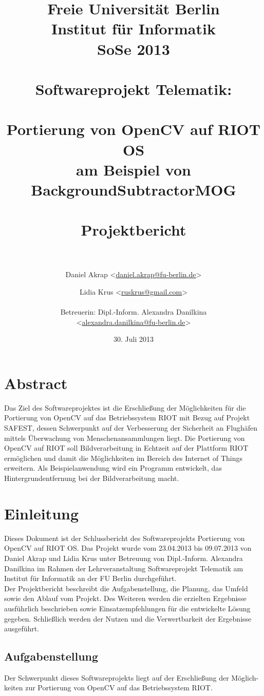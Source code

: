 \documentclass[10pt,a4paper]{article}
\title{Freie Universität Berlin \\
	Institut für Informatik \\
	SoSe 2013 \\ \ \\
	Softwareprojekt Telematik: \\ \ \\
	\textbf {Portierung von OpenCV auf RIOT OS} \\
	\textbf {am Beispiel von BackgroundSubtractorMOG} \\ \ \\
	Projektbericht \\ \ \\}
\author{Daniel Akrap  \textless\href{mailto:daniel.akrap@fu-berlin.de}{daniel.akrap@fu-berlin.de}\textgreater
        \and Lidia Krus \textless\href{mailto:ruskrus@gmail.com}{ruskrus@gmail.com}\textgreater 		\\ \\
	Betreuerin: Dipl.-Inform. Alexandra Danilkina \\ 
	\textless\href{mailto:alexandra.danilkina@fu-berlin.de}{alexandra.danilkina@fu-berlin.de}\textgreater}
\date{30. Juli 2013}
\begin{document}
\maketitle

\newpage
\section*{Abstract}

Das Ziel des Softwareprojektes ist die Erschließung der Möglichkeiten für die Portierung von OpenCV auf das Betriebssystem RIOT mit Bezug auf Projekt SAFEST, dessen Schwerpunkt auf der Verbesserung der Sicherheit an Flughäfen mittels Überwachung von Menschenansammlungen liegt. Die Portierung von OpenCV auf RIOT soll Bildverarbeitung in Echtzeit auf der Plattform RIOT ermöglichen und damit die Möglichkeiten im Bereich des Internet of Things erweitern. Als Beispielanwendung wird ein Programm entwickelt, das Hintergrundentfernung bei der Bildverarbeitung macht.

\newpage
\tableofcontents
\setcounter{tocdepth}{3}

\newpage
\section{Einleitung}

Dieses Dokument ist der Schlussbericht des Softwareprojekts \glqq Portierung von OpenCV auf RIOT OS\grqq. Das Projekt wurde vom 23.04.2013 bis 09.07.2013 von Daniel Akrap und Lidia Krus unter Betreuung von Dipl.-Inform. Alexandra Danilkina im Rahmen der Lehrveranstaltung Softwareprojekt Telematik am Institut für Informatik an der FU Berlin durchgeführt. \\

Der Projektbericht beschreibt die Aufgabenstellung, die Planung, das Umfeld sowie den Ablauf vom Projekt. Des Weiteren werden die erzielten Ergebnisse ausführlich beschrieben sowie Einsatzempfehlungen für die entwickelte Lösung gegeben. Schließlich werden der Nutzen und die Verwertbarkeit der Ergebnisse ausgeführt.

\subsection{Aufgabenstellung}

Der Schwerpunkt dieses Softwareprojekts liegt auf der Erschließung der Möglich-keiten zur Portierung von OpenCV auf das Betriebssystem RIOT. \\
\end{document}
